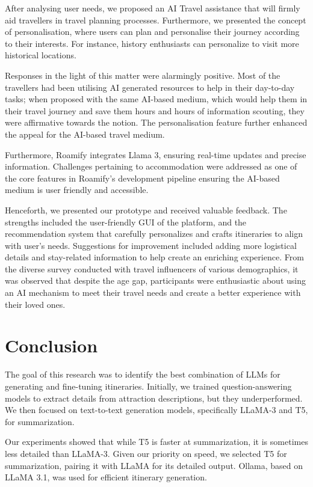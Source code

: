 \documentclass[final,1p,times]{elsarticle}
\begin{document}
   After analysing user needs, we proposed an AI Travel assistance that will firmly aid travellers in travel planning processes. Furthermore, we presented the concept of personalisation, where users can plan and personalise their journey according to their interests. For instance, history enthusiasts can personalize to visit more historical locations.
    
    Responses in the light of this matter were alarmingly positive. Most of the travellers had been utilising AI generated resources to help in their day-to-day tasks; when proposed with the same AI-based medium, which would help them in their travel journey and save them hours and hours of information scouting, they were affirmative towards the notion. The personalisation feature further enhanced the appeal for the AI-based travel medium.
    
    Furthermore, Roamify integrates Llama 3, ensuring real-time updates and precise information. Challenges pertaining to accommodation were addressed as one of the core features in Roamify's development pipeline ensuring the AI-based medium is user friendly and accessible.
    
    Henceforth, we presented our prototype and received valuable feedback. The strengths included the user-friendly GUI of the platform, and the recommendation system that carefully personalizes and crafts itineraries to align with user's needs. Suggestions for improvement included adding more logistical details and stay-related information to help create an enriching experience. From the diverse survey conducted with travel influencers of various demographics, it was observed that despite the age gap, participants were enthusiastic about using an AI mechanism to meet their travel needs and create a better experience with their loved ones.

\section{Conclusion}
    
    The goal of this research was to identify the best combination of LLMs for generating and fine-tuning itineraries. Initially, we trained question-answering models to extract details from attraction descriptions, but they underperformed. We then focused on text-to-text generation models, specifically LLaMA-3 and T5, for summarization.
    
    Our experiments showed that while T5 is faster at summarization, it is sometimes less detailed than LLaMA-3. Given our priority on speed, we selected T5 for summarization, pairing it with LLaMA for its detailed output. Ollama, based on LLaMA 3.1, was used for efficient itinerary generation.
    
\end{document}
